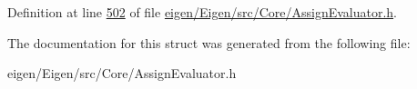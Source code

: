 Definition at line \hyperlink{eigen_2_eigen_2src_2_core_2_assign_evaluator_8h_source_l00502}{502} of file \hyperlink{eigen_2_eigen_2src_2_core_2_assign_evaluator_8h_source}{eigen/\+Eigen/src/\+Core/\+Assign\+Evaluator.\+h}.



The documentation for this struct was generated from the following file\+:\begin{DoxyCompactItemize}
\item 
eigen/\+Eigen/src/\+Core/\+Assign\+Evaluator.\+h\end{DoxyCompactItemize}
